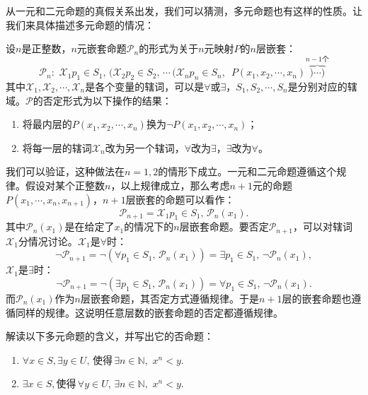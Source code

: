 \documentclass[12pt,UTF8,fontset=none]{ctexbook}
\begin{document}
从一元和二元命题的真假关系出发，我们可以猜测，多元命题也有这样的性质。让我们来具体描述多元命题的情况：
\begin{tm}
    设$n$是正整数，$n$元嵌套命题$\mathcal{P}_n$的形式为关于$n$元映射$P$的$n$层嵌套：
    $$ \mathcal{P}_n:\,\, \mathcal{X}_1 p_1\in S_1,\,(\mathcal{X}_2 p_2\in S_2,\,\cdots \,(\mathcal{X}_n p_n\in S_n,\,\,\,P(x_1,x_2,\cdots,x_n)\overbrace{)\cdots)}^{n-1\text{个}} $$
    其中$\mathcal{X}_1,\mathcal{X}_2,\cdots,\mathcal{X}_n$是各个变量的辖词，可以是$\forall$或$\exists$，$S_1,S_2,\cdots,S_n$是分别对应的辖域。$\mathcal{P}$的否定形式为以下操作的结果：
    \begin{enumerate}[label=\arabic*.]
        \item 将最内层的$P(x_1,x_2,\cdots,x_n)$换为$\neg P(x_1,x_2,\cdots,x_n)$；
        \item 将每一层的辖词$\mathcal{X}_n$改为另一个辖词，$\forall$改为$\exists$，$\exists$改为$\forall$。
    \end{enumerate}
\end{tm}
我们可以验证，这种做法在$n=1,2$的情形下成立。一元和二元命题遵循这个规律。假设对某个正整数$n$，以上规律成立，那么考虑$n+1$元的命题$P(x_1,\cdots,x_n,x_{n+1})$，$n+1$层嵌套的命题可以看作：
$$ \mathcal{P}_{n+1} = \mathcal{X}_1 p_1\in S_1,\, \mathcal{P}_n(x_1). $$
其中$\mathcal{P}_n(x_1)$是在给定了$x_{1}$的情况下的$n$层嵌套命题。要否定$\mathcal{P}_{n+1}$，可以对辖词$\mathcal{X}_1$分情况讨论。$\mathcal{X}_1$是$\forall$时：
$$ \neg \mathcal{P}_{n+1} = \neg \left(\forall p_1\in S_1,\, \mathcal{P}_n(x_1)\right) = \exists p_1 \in S_1,\, \neg \mathcal{P}_n(x_1), $$
$\mathcal{X}_1$是$\exists$时：
$$ \neg \mathcal{P}_{n+1} = \neg \left(\exists p_1\in S_1,\, \mathcal{P}_n(x_1)\right) = \forall p_1 \in S_1,\, \neg \mathcal{P}_n(x_1). $$
而$\mathcal{P}_n(x_1)$作为$n$层嵌套命题，其否定方式遵循规律。于是$n+1$层的嵌套命题也遵循同样的规律。这说明任意层数的嵌套命题的否定都遵循规律。

\begin{et}
    解读以下多元命题的含义，并写出它的否命题：
    \begin{enumerate}[label=\arabic*.]
        \item $\forall x\in S, \exists y \in U, \,\mbox{使得}\,\exists n \in \mathbb{N}, \,\, x^n < y. $
        \item $\exists x\in S,\mbox{使得}\, \forall y \in U, \,\exists n \in \mathbb{N}, \,\, x^n < y. $
    \end{enumerate}
\end{et}
\end{document}
